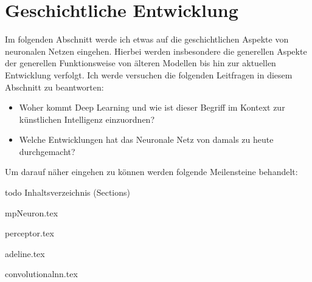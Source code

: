 \part{Geschichtliche Entwicklung}

Im folgenden Abschnitt werde ich etwas auf die geschichtlichen Aspekte von neuronalen Netzen eingehen. Hierbei werden insbesondere die generellen Aspekte der generellen Funktionsweise von älteren Modellen bis hin zur aktuellen Entwicklung verfolgt. Ich werde versuchen die folgenden Leitfragen in diesem Abschnitt zu beantworten: 

\begin{itemize}
\item Woher kommt Deep Learning und wie ist dieser Begriff im Kontext zur künstlichen Intelligenz einzuordnen?
\item Welche Entwicklungen hat das Neuronale Netz von damals zu heute durchgemacht?
\end{itemize}

Um darauf näher eingehen zu können werden folgende Meilensteine behandelt: 

todo Inhaltsverzeichnis (Sections)

{mpNeuron.tex}
\clearpage

{perceptor.tex}
\clearpage

{adeline.tex}
\clearpage

{convolutionalnn.tex}
